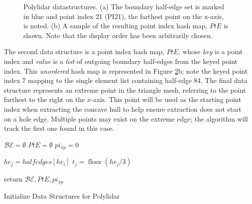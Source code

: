 \begin{figure}[ht]
\begin{subfigure}[t]{.25\linewidth}
    \caption{}
    \label{fig:ch2_hashmap}
  \end{subfigure}
  \caption[Polylidar datastructures]{Polylidar datastructures. (a) The boundary half-edge set is marked in blue and point index 21 (PI21), the farthest point on the x-axis, is noted. (b) A sample of the resulting point index hash map, $PtE$ is shown. Note that the display order has been arbitrarily chosen.  }
  \label{fig:ch2_algorithm1_visual} 
\end{figure}

The second data structure is a point index hash map, $PtE$, whose \emph{key} is a point index and \emph{value} is a \emph{list} of outgoing boundary half-edges from the keyed point index. This \emph{unordered} hash map is represented in Figure \ref{fig:ch2_algorithm1_visual}b; note the keyed point index 7 mapping to the single element list containing half-edge 84. The final data structure represents an extreme point in the triangle mesh, referring to the point farthest to the right on the $x$-axis. This point will be used as the starting point index when extracting the concave hull to help ensure extraction does not start on a hole edge. Multiple points may exist on the extreme edge;  the algorithm will track the first one found in this case. 

\begin{algorithm}[ht]

    
    $\mathcal{BE} = \emptyset$ 
    $PtE = \emptyset$ 
    $pi_{xp} = 0$ 
     { 
         { 
            $he_j = halfedges[he_i]$
            $t_j = \operatorname{floor}(he_j / 3)$ 
        }
  
    }
    return $\mathcal{BE}, PtE, pi_{xp}$
    \caption{Initialize Data Structures for Polylidar}\label{alg:ch2_boundary_edges}
\end{algorithm}


